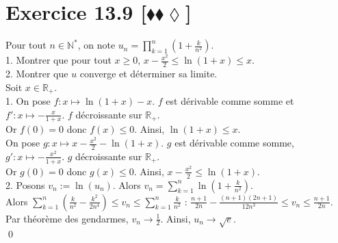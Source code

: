 \documentclass[10pt]{article}
\begin{document}
\section*{Exercice 13.9 [$\blacklozenge\blacklozenge\lozenge$]}
\begin{tcolorbox}[enhanced, width=7.6in, center, size=fbox, drop shadow southwest]
    Pour tout $n\in\mathbb{N}^*$, on note $u_n=\prod\limits_{k=1}^{n}\left( 1 + \frac{k}{n^2} \right)$.\\
    1. Montrer que pour tout $x\geq0$, $x-\frac{x^2}{2} \leq \ln(1+x) \leq x$.\\
    2. Montrer que $u$ converge et déterminer sa limite.\\[0.1cm]
    Soit $x\in\mathbb{R}_+$.\\
    1. On pose $f:x\mapsto\ln(1+x) - x$. $f$ est dérivable comme somme et $f':x\mapsto-\frac{x}{1+x}$. $f$ décroissante sur $\mathbb{R}_+$.\\
    Or $f(0)=0$ donc $f(x)\leq0$. Ainsi, $\ln(1+x) \leq x$.\\[0.1cm]
    On pose $g:x\mapsto x-\frac{x^2}{2} - \ln(1+x)$. $g$ est dérivable comme somme, $g':x\mapsto -\frac{x^2}{1+x}$. $g$ décroissante sur $\mathbb{R}_+$.\\
    Or $g(0)=0$ donc $g(x)\leq0$. Ainsi, $x - \frac{x^2}{2} \leq \ln(1+x)$.\\[0.1cm]
    2. Posons $v_n := \ln(u_n)$. Alors $v_n = \sum\limits_{k=1}^n\ln\left( 1+\frac{k}{n^2} \right)$.\\
    Alors $\sum\limits_{k=1}^n(\frac{k}{n^2}-\frac{k^2}{2n^4}) \leq v_n \leq \sum\limits_{k=1}^n\frac{k}{n^2}$ : $\frac{n+1}{2n} - \frac{(n+1)(2n+1)}{12n^3}\leq v_n \leq \frac{n+1}{2n}$.\\
    Par théorème des gendarmes, $v_n \to \frac{1}{2}$. Ainsi, $u_n \to \sqrt{e}$.\\
    \qed
\end{tcolorbox}

\end{document}
